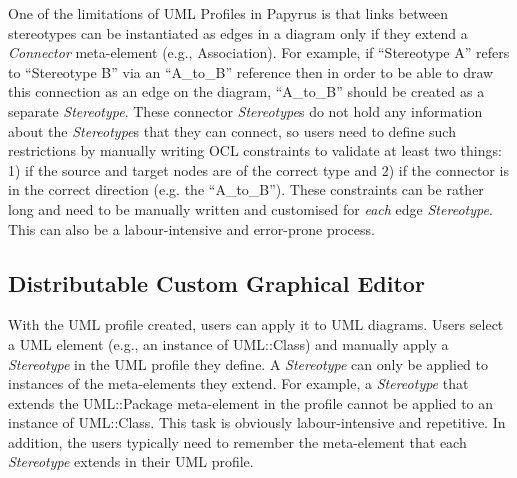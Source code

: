 One of the limitations of UML Profiles in Papyrus is that links between stereotypes can be instantiated as edges in a diagram only if they extend a \textit{Connector} meta-element (e.g., Association).  
For example, if ``Stereotype A'' refers to ``Stereotype B'' via an ``A\_to\_B'' reference then in order to be able to draw this connection as an edge on the diagram, ``A\_to\_B'' should be created as a separate \textit{Stereotype}. 
These connector \textit{Stereotype}s do not hold any information about the \textit{Stereotype}s that they can connect, so users need to define such restrictions by manually writing OCL constraints to validate at least two things: 1) if the source and target nodes are of the correct type and 2) if the connector is in the correct direction (e.g. the ``A\_to\_B''). 
These constraints can be rather long and need to be manually written and customised for \textit{each} edge \textit{Stereotype}. This can also be a labour-intensive and error-prone process.

\subsection{Distributable Custom Graphical Editor}
With the UML profile created, users can apply it to UML diagrams. 
Users select a UML element (e.g., an instance of UML::Class) and manually apply a \textit{Stereotype} in the UML profile they define. 
A \textit{Stereotype} can only be applied to instances of the meta-elements they extend.
For example, a \textit{Stereotype} that extends the UML::Package meta-element in the profile cannot be applied to an instance of UML::Class. 
This task is obviously labour-intensive and repetitive. 
In addition, the users typically need to remember the meta-element that each \textit{Stereotype} extends in their UML profile. 

